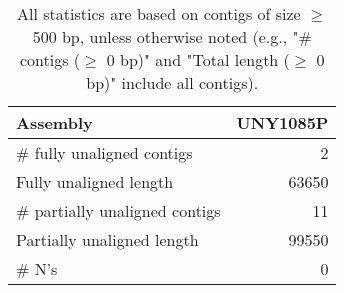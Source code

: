 \documentclass[12pt,a4paper]{article}
\begin{document}
\begin{table}[ht]
\begin{center}
\caption{All statistics are based on contigs of size $\geq$ 500 bp, unless otherwise noted (e.g., "\# contigs ($\geq$ 0 bp)" and "Total length ($\geq$ 0 bp)" include all contigs).}
\begin{tabular}{|l*{1}{|r}|}
\hline
Assembly & UNY1085P \\ \hline
\# fully unaligned contigs & 2 \\ \hline
Fully unaligned length & 63650 \\ \hline
\# partially unaligned contigs & 11 \\ \hline
Partially unaligned length & 99550 \\ \hline
\# N's & 0 \\ \hline
\end{tabular}
\end{center}
\end{table}
\end{document}
